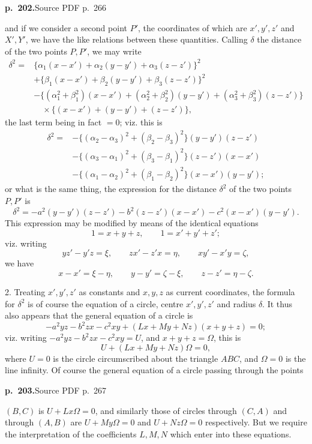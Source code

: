 \documentclass[11pt,a4paper]{article}
\newcommand{\sourcepage}[2]{\par\bigskip\noindent\textbf{p.~#1.}\hfill{\footnotesize Source PDF p.~#2}\par\nobreak\medskip}
\begin{document}
\sourcepage{202}{266}
and if we consider a second point $P'$, the coordinates of which are $x',y',z'$ and $X',Y'$, we have the like relations between these quantities. Calling $\delta$ the distance of the two points $P,P'$, we may write
\begin{align*}
\delta^2={}&\{\alpha_1(x-x')+\alpha_2(y-y')+\alpha_3(z-z')\}^2\\
&+\{\beta_1(x-x')+\beta_2(y-y')+\beta_3(z-z')\}^2\\
&-\{(\alpha_1^2+\beta_1^2)(x-x')+(\alpha_2^2+\beta_2^2)(y-y')
  +(\alpha_3^2+\beta_3^2)(z-z')\}\\
&\quad\times\{(x-x')+(y-y')+(z-z')\},
\end{align*}
the last term being in fact $=0$; viz. this is
\begin{align*}
\delta^2={}&-\{(\alpha_2-\alpha_3)^2+(\beta_2-\beta_3)^2\}(y-y')(z-z')\\
&-\{(\alpha_3-\alpha_1)^2+(\beta_3-\beta_1)^2\}(z-z')(x-x')\\
&-\{(\alpha_1-\alpha_2)^2+(\beta_1-\beta_2)^2\}(x-x')(y-y');
\end{align*}
or what is the same thing, the expression for the distance $\delta^2$ of the two points $P,P'$ is
\[
\delta^2=-a^2(y-y')(z-z')-b^2(z-z')(x-x')-c^2(x-x')(y-y').
\]
This expression may be modified by means of the identical equations
\[
1=x+y+z,\qquad 1=x'+y'+z';
\]
viz. writing
\[
yz'-y'z=\xi,\qquad zx'-z'x=\eta,\qquad xy'-x'y=\zeta,
\]
we have
\[
x-x'=\xi-\eta,\qquad y-y'=\zeta-\xi,\qquad z-z'=\eta-\zeta.
\]

2. Treating $x',y',z'$ as constants and $x,y,z$ as current coordinates, the formula for $\delta^2$ is of course the equation of a circle, centre $x',y',z'$ and radius $\delta$. It thus also appears that the general equation of a circle is
\[
-a^2yz-b^2zx-c^2xy+(Lx+My+Nz)(x+y+z)=0;
\]
viz. writing $-a^2yz-b^2zx-c^2xy=U$, and $x+y+z=\Omega$, this is
\[
U+(Lx+My+Nz)\Omega=0,
\]
where $U=0$ is the circle circumscribed about the triangle $ABC$, and $\Omega=0$ is the line infinity. Of course the general equation of a circle passing through the points

\sourcepage{203}{267}
$(B,C)$ is $U+Lx\Omega=0$, and similarly those of circles through $(C,A)$ and through $(A,B)$ are $U+My\Omega=0$ and $U+Nz\Omega=0$ respectively. But we require the interpretation of the coefficients $L,M,N$ which enter into these equations.
\end{document}
